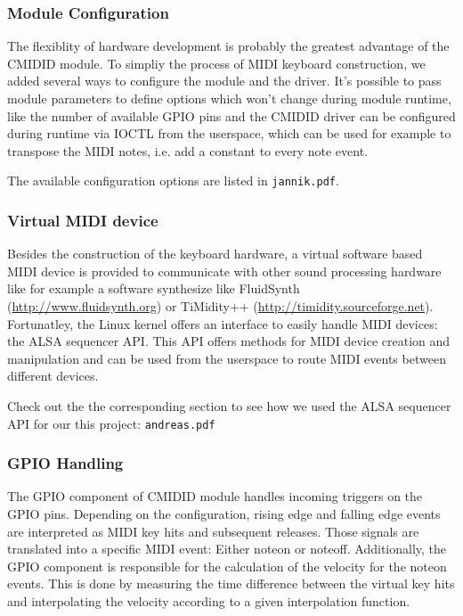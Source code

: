 \documentclass[paper=a4,fontsize=11pt,twocolumn,pagesize,bibtotoc]{scrartcl}
\begin{document}
\subsubsection{Module Configuration}
\label{cmidid:configuration}

The flexiblity of hardware development is probably the greatest advantage of 
the CMIDID module. To simpliy the process of MIDI keyboard construction, we 
added several ways to configure the module and the driver. It's possible to 
pass module parameters to define options which won't change during module 
runtime, like the number of available GPIO pins and the CMIDID driver can 
be configured during runtime via IOCTL from the userspace, which can be used 
for example to transpose the MIDI notes, i.e. add a constant to every note 
event.

The available configuration options are listed in \texttt{jannik.pdf}.

\subsubsection{Virtual MIDI device}
\label{cmidid:midi}

Besides the construction of the keyboard hardware, a virtual software based 
MIDI device is provided to communicate with other sound processing hardware 
like for example a software synthesize like FluidSynth 
(\url{http://www.fluidsynth.org}) or TiMidity++ 
(\url{http://timidity.sourceforge.net}). Fortunatley, the Linux kernel 
offers an interface to easily handle MIDI devices: the ALSA sequencer API.
This API offers methods for MIDI 
device creation and manipulation and can be used from the userspace to 
route MIDI events between different devices.

Check out the the corresponding section to see how we used the ALSA sequencer API for
our this project: \texttt{andreas.pdf}

\subsubsection{GPIO Handling}
\label{cmidid:gpio}

The GPIO component of CMIDID module handles incoming triggers on the GPIO 
pins. Depending on the configuration, rising edge and falling edge events 
are interpreted as MIDI key hits and subsequent releases. Those signals are 
translated into a specific MIDI event: Either noteon or noteoff. Additionally, 
the GPIO component is responsible for the calculation of the velocity for 
the noteon events. This is done by measuring the time difference between 
the virtual key hits and interpolating the velocity according to a given 
interpolation function.
\end{document}
